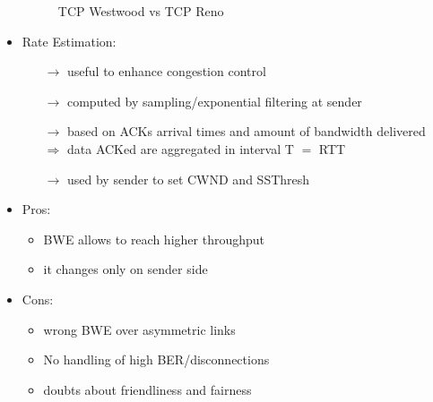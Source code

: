 \begin{itemize}
\begin{figure}[!h]
        \caption{TCP Westwood vs TCP Reno}
        \label{westwood-vs-reno}
    \end{figure}
    \newpage
    \item Rate Estimation:
    \begin{itemize}
        \item[$\rightarrow$] useful to enhance congestion control
        \item[$\rightarrow$] computed by sampling/exponential filtering at sender
        \item[$\rightarrow$] based on ACKs arrival times and amount of bandwidth delivered\\
        $\Rightarrow$ data ACKed are aggregated in interval T $=$ RTT
        \item[$\rightarrow$] used by sender to set CWND and SSThresh
    \end{itemize}
    \item Pros:
    \begin{itemize}
        \item BWE allows to reach higher throughput
        \item it changes only on sender side
    \end{itemize}
    \item Cons:
    \begin{itemize}
        \item wrong BWE over asymmetric links
        \item No handling of high BER/disconnections
        \item doubts about friendliness and fairness
    \end{itemize}
\end{itemize}

